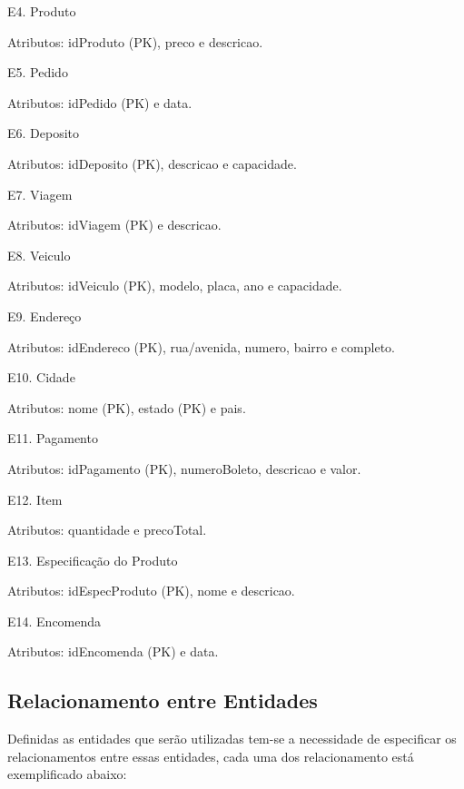 \documentclass[12pt, onecolumn, titlepage]{article}
\begin{document}
\begin{description}
\item E4. Produto
\item \qquad Atributos: idProduto (PK), preco e descricao.

\item E5. Pedido
\item \qquad Atributos: idPedido (PK) e data.

\item E6. Deposito
\item \qquad Atributos: idDeposito (PK), descricao e capacidade.

\item E7. Viagem
\item \qquad Atributos: idViagem (PK) e descricao.

\item E8. Veiculo
\item \qquad Atributos: idVeiculo (PK), modelo, placa, ano e capacidade.

\item E9. Endereço
\item \qquad Atributos: idEndereco (PK), rua/avenida, numero, bairro e completo.

\item E10. Cidade
\item \qquad Atributos: nome (PK), estado (PK) e pais.

\item E11. Pagamento
\item \qquad Atributos: idPagamento (PK), numeroBoleto, descricao e valor.

\item E12. Item
\item \qquad Atributos: quantidade e precoTotal.

\item E13. Especificação do Produto
\item \qquad Atributos: idEspecProduto (PK), nome e descricao.

\item E14. Encomenda
\item \qquad Atributos: idEncomenda (PK) e data.

\end{description}

\subsection{Relacionamento entre Entidades}
\label{sect:relacionamento}

Definidas as entidades que serão utilizadas tem-se a necessidade de especificar os relacionamentos entre essas entidades, cada uma dos relacionamento está exemplificado abaixo:
\end{document}
